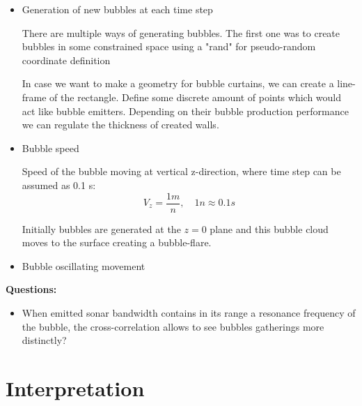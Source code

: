 \documentclass[11pt]{article}
\begin{document}
\begin{itemize}
    
    \item Generation of new bubbles at each time step 

    There are multiple ways of generating bubbles. The first one was to create bubbles in some constrained space using a "rand" for pseudo-random coordinate definition

    In case we want to make a geometry for bubble curtains, we can create a line-frame of the rectangle. Define some discrete amount of points which would act like bubble emitters. Depending on their bubble production performance we can regulate the thickness of created walls.

    \item  Bubble speed 
    
    Speed of the bubble moving at vertical z-direction, where time step can be assumed as 0.1 s:
    \[V_z = \frac{1 m}{n}, \quad 1n \approx 0.1 s\]

    Initially bubbles are generated at the $z=0$ plane and this bubble cloud moves to the surface creating a bubble-flare.

    

    \item Bubble oscillating movement
\end{itemize}

\textbf{Questions:}
\begin{itemize}
    \item When emitted sonar bandwidth contains in its range a resonance frequency of the bubble, the cross-correlation allows to see bubbles gatherings more distinctly?
\end{itemize}

%
%
%
%
\section{Interpretation}

%
%
%
%
\end{document}
